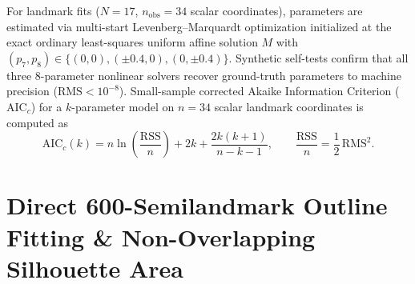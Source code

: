 \documentclass[11pt,a4paper]{article}
\theoremstyle{definition}
\theoremstyle{remark}
\newcommand{\AICc}{\mathrm{AIC}_c}
\begin{document}
For landmark fits ($N = 17$, $n_{\mathrm{obs}} = 34$ scalar coordinates), parameters are estimated via multi-start Levenberg--Marquardt optimization initialized at the exact ordinary least-squares uniform affine solution $M$ with $(p_7, p_8) \in \{(0,0), (\pm 0.4, 0), (0, \pm 0.4)\}$. Synthetic self-tests confirm that all three 8-parameter nonlinear solvers recover ground-truth parameters to machine precision ($\mathrm{RMS} < 10^{-8}$). Small-sample corrected Akaike Information Criterion ($\AICc$) for a $k$-parameter model on $n = 34$ scalar landmark coordinates is computed as
\begin{equation}
  \AICc(k) = n \ln\!\left(\frac{\mathrm{RSS}}{n}\right) + 2k + \frac{2k(k+1)}{n - k - 1}, \qquad \frac{\mathrm{RSS}}{n} = \frac{1}{2}\,\mathrm{RMS}^2.
\end{equation}

\section{Direct 600-Semilandmark Outline Fitting \& Non-Overlapping Silhouette Area}
\end{document}
